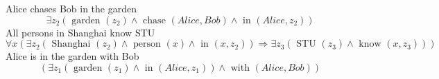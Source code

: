\documentclass{article}
\begin{document}
Alice chases Bob in the garden
$$
\exists z_2 ( \text{ garden } ( z_2 ) \wedge \text{ chase } ( Alice , Bob ) \wedge \text{ in } ( Alice , z_2 ) ) 
$$
\newline
All persons in Shanghai know STU
$$
\forall x ( \exists z_2 ( \text{ Shanghai } ( z_2 ) \wedge \text{ person } ( x ) \wedge \text{ in } ( x , z_2 ) ) \Rightarrow \exists z_3 ( \text{ STU } ( z_3 ) \wedge \text{ know } ( x , z_3 ) ) ) 
$$
\newline
Alice is in the garden with Bob
$$
( \exists z_1 ( \text{ garden } ( z_1 ) \wedge \text{ in } ( Alice , z_1 ) ) \wedge \text{ with } ( Alice , Bob ) ) 
$$
\newline
\end{document}
